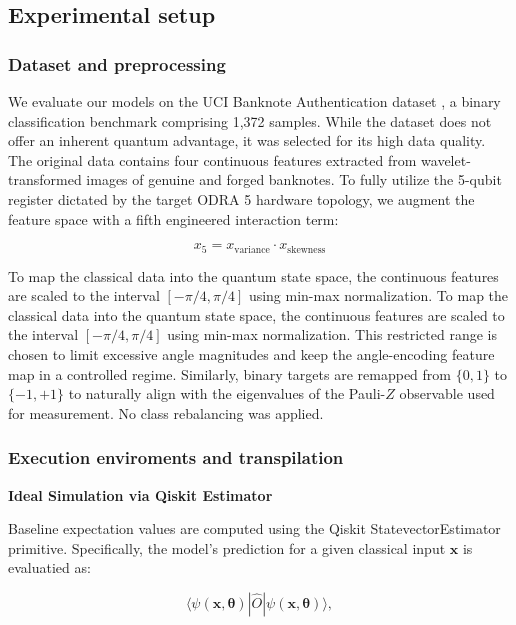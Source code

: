 \documentclass[11pt]{article}
\begin{document}
\subsection{Experimental setup}
\subsubsection{Dataset and preprocessing}

We evaluate our models on the UCI Banknote Authentication dataset \cite{ucibanknote}, a binary classification benchmark comprising 1,372 samples. While the dataset does not offer an inherent quantum advantage, it was selected for its high data quality. The original data contains four continuous features extracted from wavelet-transformed images of genuine and forged banknotes. To fully utilize the 5-qubit register dictated by the target ODRA 5 hardware topology, we augment the feature space with a fifth engineered interaction term:

\begin{equation}
x_5 = x_{\mathrm{variance}} \cdot x_{\mathrm{skewness}}
\end{equation}


To map the classical data into the quantum state space, the continuous features are scaled to the interval $[-\pi/4,\pi/4]$ using min-max normalization. To map the classical data into the quantum state space, the continuous features are scaled to the interval $[-\pi/4,\pi/4]$ using min-max normalization. This restricted range is chosen to limit excessive angle magnitudes and keep the angle-encoding feature map in a controlled regime. Similarly, binary targets are remapped from $\{0,1\}$ to $\{-1,+1\}$ to naturally align with the eigenvalues of the Pauli-$Z$ observable used for measurement. No class rebalancing was applied.



\subsubsection{Execution enviroments and transpilation}


\textbf{Ideal Simulation via Qiskit Estimator}

Baseline expectation values are computed using the Qiskit StatevectorEstimator primitive. Specifically, the model's prediction for a given classical input $\mathbf{x}$ is evaluatied as: 

\begin{equation}
\langle \psi(\mathbf{x}, \boldsymbol{\theta}) | \hat{O} | \psi(\mathbf{x}, \boldsymbol{\theta}) \rangle, 
\end{equation}
\end{document}
